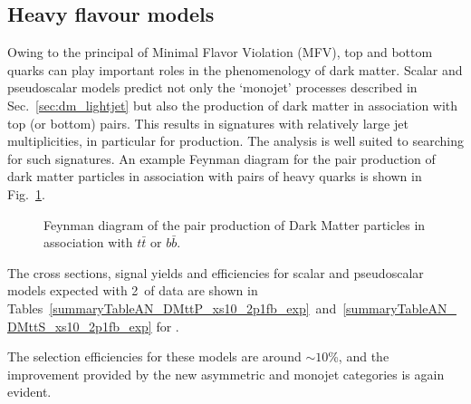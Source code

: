 

\clearpage \subsection{Heavy flavour models} \label{sec:dm_heavyjet}

Owing to the principal of Minimal Flavor Violation (MFV), top and bottom quarks
can play important roles in the phenomenology of dark matter. Scalar and
pseudoscalar models predict not only the `monojet' processes described in
Sec.~\ref{sec:dm_lightjet} but also the production of dark matter in association
with top (or bottom) pairs. This results in signatures with relatively large jet
multiplicities, in particular for \DMtt production. The \alphat analysis is well 
suited to searching for such signatures. An example Feynman diagram for the pair
production of dark matter particles in association with pairs of heavy quarks is
shown in Fig.~\ref{fig:feynman_hf}.


\begin{figure}[h!] \centering
{}
\caption{Feynman diagram of the pair production of Dark Matter particles in
association with $t\bar{t}$ or $b\bar{b}$. \cite{Abercrombie:2015wmb}}
\label{fig:feynman_hf} \end{figure}


The cross sections, signal yields and efficiencies for scalar and pseudoscalar
\DMtt models expected with 2~\ifb of data are shown in 
Tables~\ref{summaryTableAN_DMttP_xs10_2p1fb_exp}~and~\ref{summaryTableAN_DMttS_xs10_2p1fb_exp} for \DMtt. 

The selection efficiencies for these models are around $\sim 10$\%, and the improvement
provided by the new asymmetric and monojet categories is again evident.


